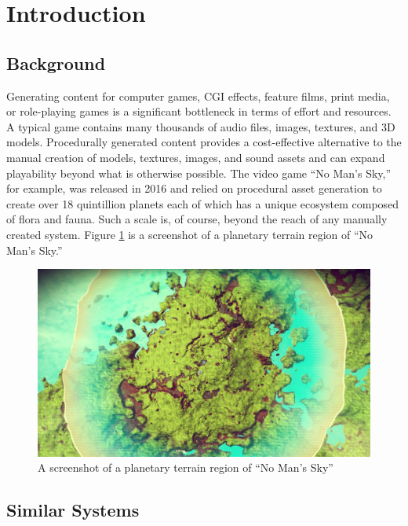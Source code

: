 \section{Introduction}
\label{sec:Introduction}

\subsection{Background}
\label{sec:Introduction>Background}
Generating content for computer games, CGI effects, feature films, print media, or role-playing games is a significant bottleneck in terms of effort and resources. A typical game contains many thousands of audio files, images, textures, and 3D models. Procedurally generated content provides a cost-effective alternative to the manual creation of models, textures, images, and sound assets and can expand playability beyond what is otherwise possible. The video game ``No Man's Sky,'' for example, was released in 2016 and relied on procedural asset generation to create over 18 quintillion planets each of which has a unique ecosystem composed of flora and fauna. Such a scale is, of course, beyond the reach of any manually created system. Figure \ref{fig:Screenshot NoManSky} is a screenshot of a planetary terrain region of ``No Man's Sky.''

\begin{figure}[!htb]
\centering
\includegraphics[width=\textwidth]{section01/assets/screenshot_NoManSky.jpg}
\caption[A screenshot of a planetary terrain region of ``No Man's Sky'']{\label{fig:Screenshot NoManSky}A screenshot of a planetary terrain region of ``No Man's Sky''}
\end{figure}

\subsection{Similar Systems}
\label{sec:Introduction>Similar Systems}
